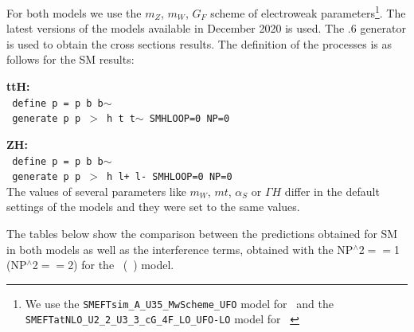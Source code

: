 For both models we use the $m_Z$, $m_W$, $G_F$ scheme of electroweak parameters\footnote{We use the \texttt{SMEFTsim\_A\_U35\_MwScheme\_UFO} model for \SMEFTsim\ and the \texttt{SMEFTatNLO\_U2\_2\_U3\_3\_cG\_4F\_LO\_UFO-LO} model for \SMEFTatNLO\ }. The latest versions of the models available in December 2020 is used.  The .6 generator is used to obtain the cross sections results. The definition of the processes is as follows for the SM results:

\noindent
{\bf ttH:}\\
\noindent
  \texttt{ define p = p b b$\sim$ }\\
  \texttt{ generate p p $>$ h t t$\sim$ SMHLOOP=0 NP=0 }

\noindent
{\bf ZH:}\\
  \noindent
  \texttt{ define p = p b b$\sim$} \\
  \texttt{ generate p p $>$ h l+ l- SMHLOOP=0  NP=0     }\\
  
  The values of several parameters like $m_W$, $mt$, $\alpha_S$ or $\Gamma H$ differ in the default settings of the models and they were set to the same values.

  The tables below show the comparison between the predictions obtained for SM in both models as well as the interference terms, obtained with the NP$^{\wedge}$2$==$1 (NP$^{\wedge}$2$==$2)  for the \SMEFTsim\ (\SMEFTatNLO\ ) model.

